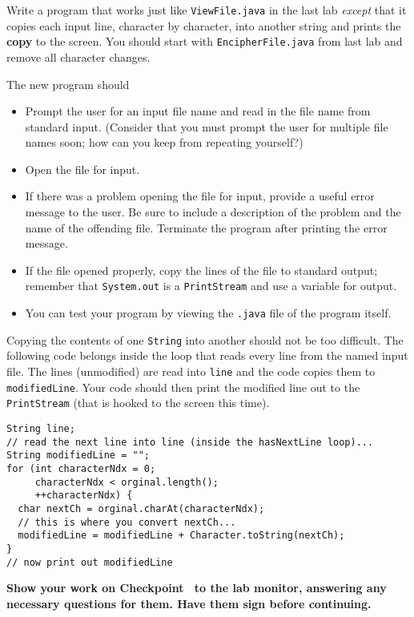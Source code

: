 \documentclass[12pt,oneside]{memoir}
\newcommand\code[1]{\lstinline^#1^}
\newcommand\fname[1]{\texttt{#1}}
\newenvironment{Checkpoint}[1]{%
  \begin{Exercise}[name={Checkpoint},title={#1}]}{%
  \end{Exercise}%
  \textbf{Show your work on Checkpoint~\theExercise{} to the lab monitor, %
    answering any necessary questions for them.  Have them sign before continuing.}}
\begin{document}
\begin{Checkpoint}{ViewFileII.java}
Write a program that works just like \fname{ViewFile.java} in the last
lab \emph{except} that it copies each input line, character by
character, into another string and prints the \textbf{copy} to the
screen. You should start with \fname{EncipherFile.java} from last lab
and remove all character changes.

The new program should
\begin{itemize}
\item Prompt the user for an input file name and read in the file name
  from standard input. (Consider that you must prompt the user for
  multiple file names soon; how can you keep from repeating yourself?)
\item Open the file for input.
\item If there was a problem opening the file for input, provide a
  useful error message to the user. Be sure to include a description
  of the problem and the name of the offending file. Terminate the
  program after printing the error message.
\item If the file opened properly, copy the lines of the file to
  standard output; remember that \code{System.out} is a
  \code{PrintStream} and use a variable for output.
\item You can test your program by viewing the \fname{.java} file of
  the program itself.
\end{itemize}

Copying the contents of one \code{String} into another should not be
too difficult. The following code belongs inside the loop that reads
every line from the named input file. The lines (unmodified) are read
into \code{line} and the code copies them to \code{modifiedLine}. Your
code should then print the modified line out to the
\code{PrintStream} (that is hooked to the screen this time).

  \begin{lstlisting}
String line;
// read the next line into line (inside the hasNextLine loop)...
String modifiedLine = "";
for (int characterNdx = 0; 
     characterNdx < orginal.length(); 
     ++characterNdx) {    
  char nextCh = orginal.charAt(characterNdx);
  // this is where you convert nextCh...
  modifiedLine = modifiedLine + Character.toString(nextCh);
}
// now print out modifiedLine
  \end{lstlisting}
\end{Checkpoint}
\end{document}
